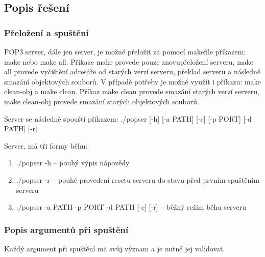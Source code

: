 \documentclass[11pt,a4paper]{report}
\begin{document}
    \subsection{Popis řešení}
    \subsubsection{Přeložení a spuštění}
    \label{subsec:makeandrun}
    POP3 server, dále jen server, je možné přeložit za pomocí makefile příkazem: make nebo make all. Příkaze make provede pouze znovupřeložení serveru, make all provede vyčištění adresáře od starých verzí serveru, překlad serveru a následné smazání objektových souborů.
    V případě potřeby je možné využít i příkazu: make clean-obj a make clean. Příkaz make clean provede smazání starých verzí serveru, make clean-obj provede smazání starých objektových souborů.\par
    Server se následně spouští příkazem: ./popser [-h] [-a PATH] [-c] [-p PORT] [-d PATH] [-r]\par
    Server, má tři formy běhu:
    \begin{enumerate}
        \item ./popser -h -- pouhý výpis nápovědy
        \item ./popser -r -- pouhé provedení resetu serveru do stavu před prvním spuštěním serveru
        \item ./popser -a PATH -p PORT -d PATH [-c] [-r] -- běžný režim běhu serveru
    \end{enumerate}
    \subsubsection{Popis argumentů při spuštění}
    Každý argument při spuštění má svůj význam a je nutné jej validovat. \par
\end{document}
